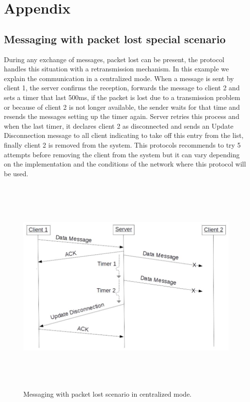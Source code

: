 \documentclass{article}
\begin{document}
\section{Appendix}


\subsection{Messaging with packet lost special scenario}

During any exchange of messages, packet lost can be present, the protocol handles this situation with a retransmission mechanism. In this example we explain the communication in a centralized mode. When a message is sent by client 1, the server confirms the reception, forwards the message to client 2 and sets a timer that last 500ms, if the packet is lost due to a transmission problem or because of client 2 is not longer available, the sender waits for that time and resends the messages setting up the timer again. Server retries this process and when the last timer, it declares client 2 as disconnected and sends an Update Disconnection message to all client indicating to take off this entry from the list, finally client 2 is removed from the system. This protocols recommends to try 5 attempts before removing the client from the system but it can vary depending on the implementation and the conditions of the network where this protocol will be used.\\

\begin{figure}[H]
\centering
\includegraphics[width=13cm, height=11cm]{Packetlost.jpg}
\caption{Messaging with packet lost scenario in centralized mode.}
\label{fig:Packetlost}
\end{figure}



\end{document}
